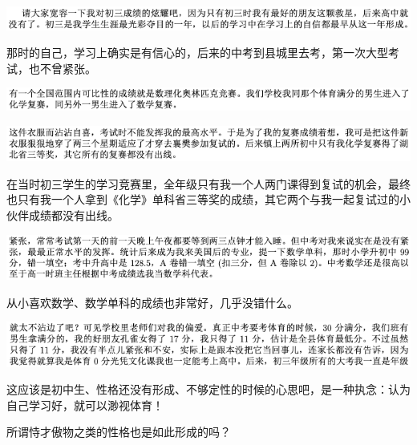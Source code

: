 \documentclass[9pt, b5paper]{article}
\begin{document}
\begin{center}
\includegraphics[width=.9\linewidth]{./pic/backups_plans_20210422_102136.png}
\end{center}

那时的自己，学习上确实是有信心的，后来的中考到县城里去考，第一次大型考试，也不曾紧张。 

\begin{center}
\includegraphics[width=.9\linewidth]{./pic/backups_plans_20210422_102214.png}
\end{center}

\begin{center}
\includegraphics[width=.9\linewidth]{./pic/backups_plans_20210422_102229.png}
\end{center}

在当时初三学生的学习竞赛里，全年级只有我一个人两门课得到复试的机会，最终也只有我一个人拿到《化学》单科省三等奖的成绩，其它两个与我一起复试过的小伙伴成绩都没有出线。 

\begin{center}
\includegraphics[width=.9\linewidth]{./pic/backups_plans_20210422_102326.png}
\end{center}

从小喜欢数学、数学单科的成绩也非常好，几乎没错什么。

\begin{center}
\includegraphics[width=.9\linewidth]{./pic/backups_plans_20210422_101951.png}
\end{center}

这应该是初中生、性格还没有形成、不够定性的时候的心思吧，是一种执念：认为自己学习好，就可以渺视体育！

所谓恃才傲物之类的性格也是如此形成的吗？
\end{document}
